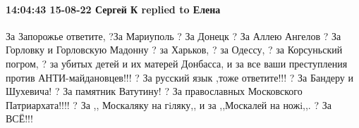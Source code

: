  
 
 
 
 

\paragraph{14:04:43 15-08-22 Сергей К replied to Елена}

\obeycr
За Запорожье ответите,
?За Мариуполь
? За Донецк
? За Аллею Ангелов
? За Горловку и Горловскую Мадонну
? за Харьков,
? за Одессу,
? за Корсуньский погром,
? за убитых детей и их матерей Донбасса,
и за все ваши преступления против АНТИ-майдановцев!!!
? За русский язык ,тоже ответите!!!
? За Бандеру и Шухевича!
? За памятник Ватутину!
? За православных Московского Патриархата!!!!
? За ,, Москаляку на гiляку,, и за ,,Москалей на ножi,,.
? За ВСЁ!!!
\restorecr
